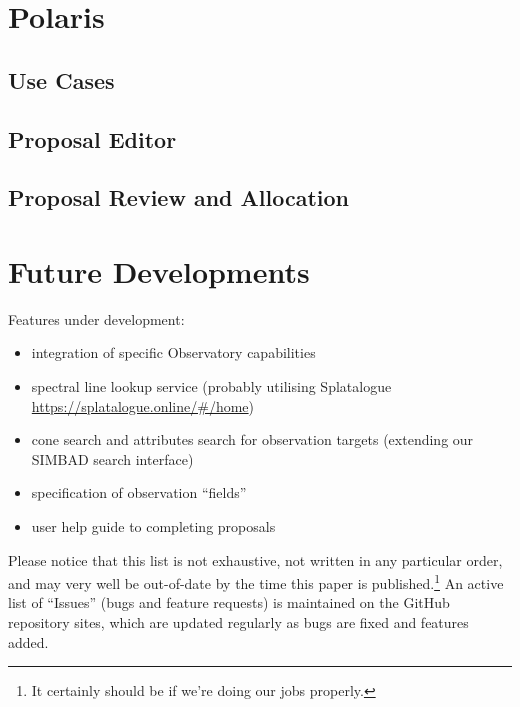 \documentclass[11pt,twoside]{article}
\begin{document}
\section{Polaris}\label{sec:polaris}

\subsection{Use Cases}\label{subsec:use-cases}

\subsection{Proposal Editor}\label{subsec:proposal-editor}


\subsection{Proposal Review and Allocation}\label{subsec:proposal-review-and-allocation}


\section{Future Developments}\label{sec:future-developments}
Features under development:
\begin{itemize}
    \item integration of specific Observatory capabilities
    \item spectral line lookup service (probably utilising Splatalogue \url{https://splatalogue.online/#/home})
    \item cone search and attributes search for observation targets (extending our SIMBAD search interface)
    \item specification of observation ``fields''
    \item user help guide to completing proposals
\end{itemize}
Please notice that this list is not exhaustive, not written in any particular order, and may very well be
out-of-date by the time this paper is published.\footnote{It certainly should be if we're doing our jobs
properly.}
An active list of ``Issues'' (bugs and feature requests) is maintained on the GitHub repository sites, which
are updated regularly as bugs are fixed and features added.
\end{document}
